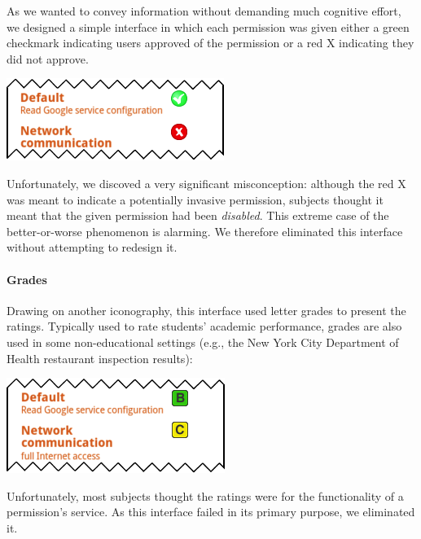 \documentclass[11pt]{article}
\begin{document}
As we wanted to convey information without demanding much cognitive effort,
we designed a simple interface in which 
each permission was given either a green 
checkmark indicating users approved of the permission or a red X indicating 
they did not approve.
\label{ss-sec-binary-r1}
\begin{center}
\includegraphics[width=.5\linewidth]{candidate-img/checkboxes/checkboxesR1.png}
\end{center}
Unfortunately, we discoved a very significant misconception:
although the red X was meant to indicate a potentially invasive permission, 
subjects thought it meant that the given permission had been \emph{disabled}. This
extreme case of the better-or-worse phenomenon is 
alarming. We therefore eliminated this interface without attempting to 
redesign it.

\paragraph{Grades}
\label{s-sec-grades}

Drawing on another iconography, this 
interface used letter grades to present the ratings. 
Typically used to rate students' academic performance, 
grades are also used in some non-educational settings (e.g., 
the New York City Department of Health restaurant 
inspection results):
\label{ss-sec-grades-r1}
\begin{center}
\includegraphics[width=.5\linewidth]{candidate-img/grades/gradesR1.png}
\end{center}
Unfortunately, most subjects thought the ratings were for 
the functionality of a permission's service. As this interface failed
in its primary purpose, we eliminated it.
\end{document}
